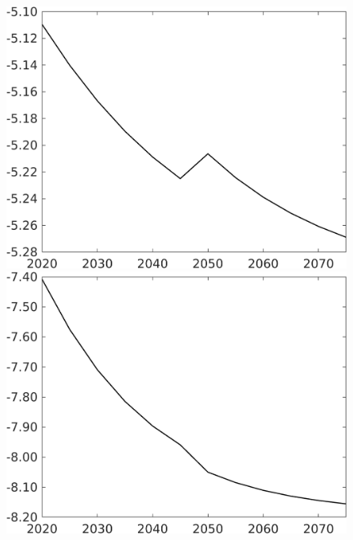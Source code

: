 \documentclass[12pt]{article}
\begin{document}
\begin{figure}[h!!]
\begin{minipage}[]{0.32\textwidth}
	\end{minipage}	
	\begin{minipage}[]{0.32\textwidth}
		\includegraphics[width=1\textwidth]{../../codding_model/own_basedOnFried/optimalPol_010922_revision/figures/all_13Sept22/CompTaufPER_bytaul_Equlab_Reg0_hl_spillover0_nsk0_xgr0_knspil1_sep0_LFlimit1_emsbase0_countec0_GovRev0_etaa0.79_lgd0.png}
	\end{minipage}	
	\begin{minipage}[]{0.32\textwidth}
		\includegraphics[width=1\textwidth]{../../codding_model/own_basedOnFried/optimalPol_010922_revision/figures/all_13Sept22/CompTaufPER_bytaul_Equlab_Reg0_C_spillover0_nsk0_xgr0_knspil1_sep0_LFlimit1_emsbase0_countec0_GovRev0_etaa0.79_lgd0.png}

\end{minipage}
\end{figure}
\end{document}
